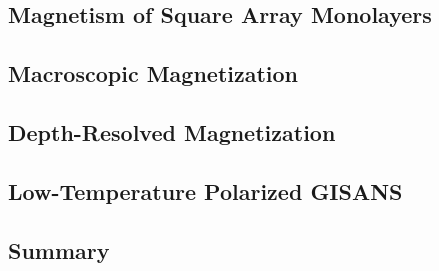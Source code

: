 \documentclass[\main/dresen_thesis.tex]{subfiles}
\renewcommand{\thisPath}{\main/chapters/monolayers/magnetism}
\begin{document}
  \subsection{Magnetism of Square Array Monolayers}
  \label{sec:monolayers:magneticStructure}


  
  \FloatBarrier

  \subsection{Macroscopic Magnetization}
    
    \FloatBarrier

  \subsection{Depth-Resolved Magnetization}
    
    \FloatBarrier

  \subsection{Low-Temperature Polarized GISANS}
    
    \FloatBarrier

  \subsection{Summary}
    
    \FloatBarrier
\end{document}
